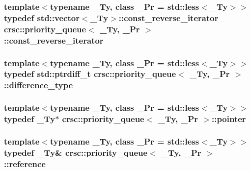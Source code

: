 \subsubsection[{\texorpdfstring{const\+\_\+reverse\+\_\+iterator}{const_reverse_iterator}}]{\setlength{\rightskip}{0pt plus 5cm}template$<$typename \+\_\+\+Ty, class \+\_\+\+Pr = std\+::less$<$\+\_\+\+Ty$>$$>$ typedef std\+::vector$<$\+\_\+\+Ty$>$\+::{\bf const\+\_\+reverse\+\_\+iterator} {\bf crsc\+::priority\+\_\+queue}$<$ \+\_\+\+Ty, \+\_\+\+Pr $>$\+::{\bf const\+\_\+reverse\+\_\+iterator}}\hypertarget{classcrsc_1_1priority__queue_a8f8f07cb4cbb172b421ff41867fbcfb9}{}\label{classcrsc_1_1priority__queue_a8f8f07cb4cbb172b421ff41867fbcfb9}
\subsubsection[{\texorpdfstring{difference\+\_\+type}{difference_type}}]{\setlength{\rightskip}{0pt plus 5cm}template$<$typename \+\_\+\+Ty, class \+\_\+\+Pr = std\+::less$<$\+\_\+\+Ty$>$$>$ typedef std\+::ptrdiff\+\_\+t {\bf crsc\+::priority\+\_\+queue}$<$ \+\_\+\+Ty, \+\_\+\+Pr $>$\+::{\bf difference\+\_\+type}}\hypertarget{classcrsc_1_1priority__queue_a859155ca3fdb5d55d136bf6758630a39}{}\label{classcrsc_1_1priority__queue_a859155ca3fdb5d55d136bf6758630a39}
\subsubsection[{\texorpdfstring{pointer}{pointer}}]{\setlength{\rightskip}{0pt plus 5cm}template$<$typename \+\_\+\+Ty, class \+\_\+\+Pr = std\+::less$<$\+\_\+\+Ty$>$$>$ typedef \+\_\+\+Ty$\ast$ {\bf crsc\+::priority\+\_\+queue}$<$ \+\_\+\+Ty, \+\_\+\+Pr $>$\+::{\bf pointer}}\hypertarget{classcrsc_1_1priority__queue_a6e6c3d342ac5217f91a33f480f626af5}{}\label{classcrsc_1_1priority__queue_a6e6c3d342ac5217f91a33f480f626af5}
\subsubsection[{\texorpdfstring{reference}{reference}}]{\setlength{\rightskip}{0pt plus 5cm}template$<$typename \+\_\+\+Ty, class \+\_\+\+Pr = std\+::less$<$\+\_\+\+Ty$>$$>$ typedef \+\_\+\+Ty\& {\bf crsc\+::priority\+\_\+queue}$<$ \+\_\+\+Ty, \+\_\+\+Pr $>$\+::{\bf reference}}\hypertarget{classcrsc_1_1priority__queue_a2e667696d4a803d1a273fbd838cd6745}{}\label{classcrsc_1_1priority__queue_a2e667696d4a803d1a273fbd838cd6745}
